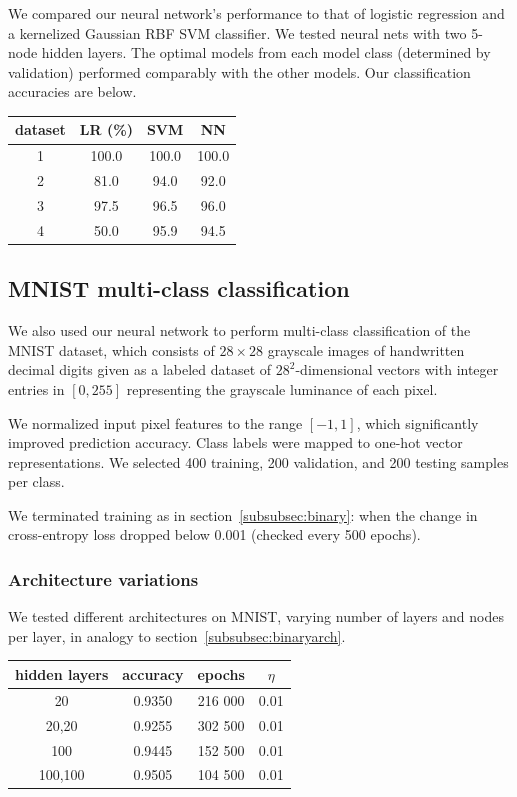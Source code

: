 \documentclass{article}
\begin{document}
\begin{multicols}{2}
We compared our neural network's performance to that of 
logistic regression and a kernelized Gaussian RBF SVM classifier.
We tested neural nets with two 5-node hidden layers.
The optimal models from each model class (determined by validation)
performed comparably with the other models.
Our classification accuracies are below.

\begin{center}
    \begin{tabular}{c|c|c|c}
        dataset & LR (\%) & SVM & NN  \\\hline
        1	&100.0& 100.0 & 100.0\\
        2	&81.0 & 94.0 & 92.0 \\
        3	&97.5 & 96.5 & 96.0 \\
        4	&50.0 & 95.9 & 94.5
    \end{tabular}
\end{center}

\subsection{MNIST multi-class classification}

We also used our neural network
to perform multi-class classification of the MNIST dataset,
which consists of $28\times 28$ grayscale images of handwritten decimal digits
given as a labeled dataset of $28^2$-dimensional vectors
with integer entries in $[0,255]$
representing the grayscale luminance of each pixel.

We normalized input pixel features to the range $[-1, 1]$,
which significantly improved prediction accuracy.
Class labels were mapped to one-hot vector representations.
We selected 400 training, 200 validation, and 200 testing samples per class.

We terminated training as in section~\ref{subsubsec:binary}:
when the change in cross-entropy loss dropped below 0.001
(checked every 500 epochs).

\subsubsection{Architecture variations}

We tested different architectures on MNIST,
varying number of layers and nodes per layer,
in analogy to section~\ref{subsubsec:binaryarch}.

\begin{center}
    \begin{tabular}{c|c|c|c}
        hidden layers & accuracy	& epochs & $\eta$ \\\hline
        20		& 0.9350 	& 216 000 	& 0.01\\
        20,20	& 0.9255 	& 302 500 	& 0.01\\
        100		& 0.9445 	& 152 500 	& 0.01 \\
        100,100	& 0.9505 	& 104 500 	& 0.01
    \end{tabular}
\end{center}


\end{multicols}
\end{document}
